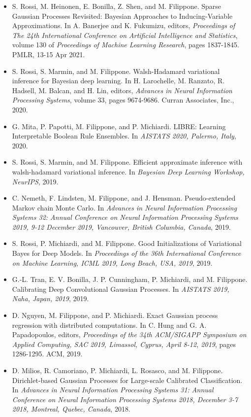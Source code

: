 \begin{itemize}
\item  S. Rossi, M. Heinonen, E. Bonilla, Z. Shen, and M. Filippone. Sparse Gaussian Processes Revisited: Bayesian Approaches to Inducing-Variable Approximations. In A. Banerjee and K. Fukumizu, editors, \emph{Proceedings of The 24th International Conference on Artificial Intelligence and Statistics}, volume 130 of \emph{Proceedings of Machine Learning Research}, pages 1837-1845. PMLR, 13-15 Apr 2021.  
\item  S. Rossi, S. Marmin, and M. Filippone. Walsh-Hadamard variational inference for Bayesian deep learning. In H. Larochelle, M. Ranzato, R. Hadsell, M. Balcan, and H. Lin, editors, \emph{Advances in Neural Information Processing Systems}, volume 33, pages 9674-9686. Curran Associates, Inc., 2020.  
\item  G. Mita, P. Papotti, M. Filippone, and P. Michiardi. LIBRE: Learning Interpretable Boolean Rule Ensembles. In \emph{AISTATS 2020, Palermo, Italy}, 2020.  
\item  S. Rossi, S. Marmin, and M. Filippone. Efficient approximate inference with walsh-hadamard variational inference. In \emph{Bayesian Deep Learning Workshop, NeurIPS}, 2019.  
\item  C. Nemeth, F. Lindsten, M. Filippone, and J. Hensman. Pseudo-extended Markov chain Monte Carlo. In \emph{Advances in Neural Information Processing Systems 32: Annual Conference on Neural Information Processing Systems 2019, 9-12 December 2019, Vancouver, British Columbia, Canada}, 2019.  
\item  S. Rossi, P. Michiardi, and M. Filippone. Good Initializations of Variational Bayes for Deep Models. In \emph{Proceedings of the 36th International Conference on Machine Learning, ICML 2019, Long Beach, USA, 2019}, 2019.  
\item  G.-L. Tran, E. V. Bonilla, J. P. Cunningham, P. Michiardi, and M. Filippone. Calibrating Deep Convolutional Gaussian Processes. In \emph{AISTATS 2019, Naha, Japan, 2019}, 2019.  
\item  D. Nguyen, M. Filippone, and P. Michiardi. Exact Gaussian process regression with distributed computations. In C. Hung and G. A. Papadopoulos, editors, \emph{Proceedings of the 34th ACM/SIGAPP Symposium on Applied Computing, SAC 2019, Limassol, Cyprus, April 8-12, 2019}, pages 1286-1295. ACM, 2019.  
\item  D. Milios, R. Camoriano, P. Michiardi, L. Rosasco, and M. Filippone. Dirichlet-based Gaussian Processes for Large-scale Calibrated Classification. In \emph{Advances in Neural Information Processing Systems 31: Annual Conference on Neural Information Processing Systems 2018, December 3-7 2018, Montreal, Quebec, Canada}, 2018.  

\end{itemize}
